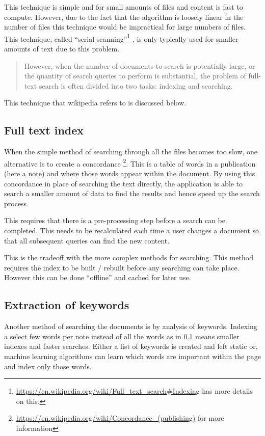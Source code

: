 This technique is simple and for small amounts of files and content is fast to
compute. However, due to the fact that the algorithm is loosely linear in the
number of files this technique would be impractical for large numbers of files.
This technique, called ``serial scanning''\footnote{%
\url{https://en.wikipedia.org/wiki/Full_text_search\#Indexing}%
has more details on this.}%
, is only typically used for smaller amounts of text due to this problem.

\blockquote{ However, when the number of documents to search is potentially
large, or the quantity of search queries to perform is substantial, the problem
of full-text search is often divided into two tasks: indexing and searching.
}\cite{wiki:full-text-search}

This technique that wikipedia refers to is discussed below.

\subsection{Full text index}\label{full-text-index}

When the simple method of searching through all the files becomes too slow, one
alternative is to create a concordance
\footnote{\url{https://en.wikipedia.org/wiki/Concordance_(publishing)} for more
information}. This is a table of words in a publication (here a note) and where
those words appear within the document. By using this concordance in place of
searching the text directly, the application is able to search a smaller amount
of data to find the results and hence speed up the search process.

This requires that there is a pre-processing step before a search can be
completed. This needs to be recalculated each time a user changes a
document so that all subsequent queries can find the new content.

This is the tradeoff with the more complex methods for searching. This method
requires the index to be built / rebuilt before any searching can take place.
However this can be done ``offline'' and cached for later use.

\subsection{Extraction of keywords}\label{extraction-of-keywords}

Another method of searching the documents is by analysis of keywords. Indexing a
select few words per note instead of all the words as in \ref{full-text-index}
means smaller indexes and faster searches.
Either a list of keywords is created and left static or, machine learning
algorithms can learn which words are important within the page and index only
those words.


